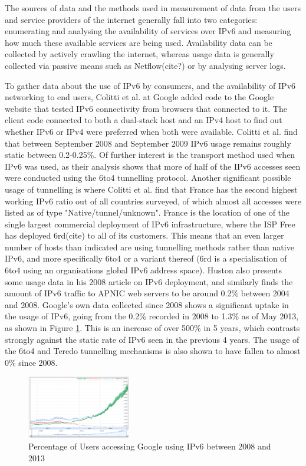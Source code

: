 The sources of data and the methods used in measurement of data from the users
and service providers of the internet generally fall into two categories:
enumerating and analysing the availability of services over IPv6 and measuring
how much these available services are being used. Availability data can be
collected by actively crawling the internet, whereas usage data is generally
collected via passive means such as Netflow(cite?) or by analysing server logs.

To gather data about the use of IPv6 by consumers, and the availability of IPv6
networking to end users, Colitti et al. at Google added code to the Google
website that tested IPv6 connectivity from browsers that connected to it. The
client code connected to both a dual-stack host and an IPv4 host to find out
whether IPv6 or IPv4 were preferred when both were available. Colitti et al.
find that between September 2008 and September 2009 IPv6 usage remains roughly
static between 0.2-0.25\%. Of further interest is the transport method used when
IPv6 was used, as their analysis shows that more of half of the IPv6 accesses
seen were conducted using the 6to4 tunnelling protocol. Another significant
possible usage of tunnelling is where Colitti et al. find that France has the
second highest working IPv6 ratio out of all countries surveyed, of which
almost all accesses were listed as of type "Native/tunnel/unknown". France is
the location of one of the single largest commercial deployment of IPv6
infrastructure, where the ISP Free has deployed 6rd(cite) to all of its
customers. This means that an even larger number of hosts than indicated are
using tunnelling methods rather than native IPv6, and more specifically 6to4 or
a variant thereof (6rd is a specialisation of 6to4 using an organisations
global IPv6 address space). Huston also presents some usage data in his 2008
article on IPv6 deployment, and similarly finds the amount of IPv6 traffic to
APNIC web servers to be around 0.2\% between 2004 and 2008. Google's own data
collected since 2008 shows a significant uptake in the usage of IPv6, going from
the 0.2\% recorded in 2008 to 1.3\% as of May 2013, as shown in Figure
\ref{fig:google-access}. This is an increase of over
500\% in 5 years, which contrasts strongly against the static rate of IPv6 seen
in the previous 4 years. The usage of the 6to4 and Teredo tunnelling mechanisms
is also shown to have fallen to almost 0\% since 2008.

\begin{figure}[htb]
\centering
\includegraphics[width=0.4\textwidth]{img/v6-google-access.png}
\caption{Percentage of Users accessing Google using IPv6 between 2008 and 2013}
\label{fig:google-access}
\end{figure}

